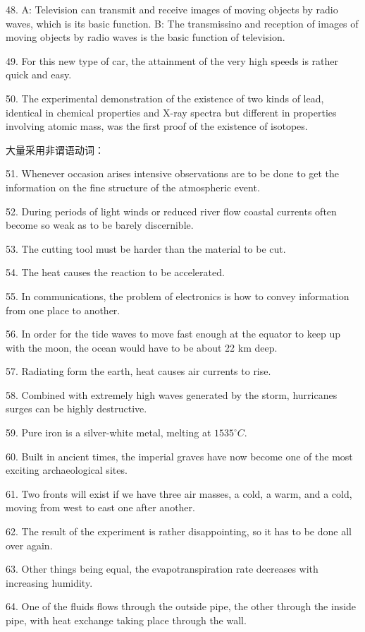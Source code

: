 \documentclass[a4paper,twocolumn,10pt]{article}
\begin{document}
\begin{CJK}{UTF8}{gkai}
48. A: Television can transmit and receive images of moving objects
by radio waves, which is its basic function.
B: The transmissino and reception of images of moving objects by radio
waves is the basic function of television.

49. For this new type of car, the attainment of the very high speeds
is rather quick and easy.

50. The experimental demonstration of the existence of two kinds of
lead, identical in chemical properties and X-ray spectra but different in
properties involving atomic mass, was the first proof of the existence
of isotopes.

大量采用非谓语动词：

51. Whenever occasion arises intensive observations are to be done to 
get the information on the fine structure of the atmospheric event.

52. During periods of light winds or reduced river flow coastal
currents often become so weak as to be barely discernible.

53. The cutting tool must be harder than the material to be cut.

54. The heat causes the reaction to be accelerated.

55. In communications, the problem of electronics is how to convey
information from one place to another.

56. In order for the tide waves to move fast enough at the equator
to keep up with the moon, the ocean would have to be about 22 km deep.

57. Radiating form the earth, heat causes air currents to rise.

58. Combined with extremely high waves generated by the storm,
hurricanes surges can be highly destructive.

59. Pure iron is a silver-white metal, melting at $1535^\circ C$.

60. Built in ancient times, the imperial graves have now become one
of the most exciting archaeological sites.

61. Two fronts will exist if we have three air masses, a cold, a warm,
and a cold, moving from west to east one after another.

62. The result of the experiment is rather disappointing, so it has to
be done all over again.

63. Other things being equal, the evapotranspiration rate decreases
with increasing humidity.

64. One of the fluids flows through the outside pipe, the other 
through the inside pipe, with heat exchange taking place through the wall.


\end{CJK}
\end{document}
